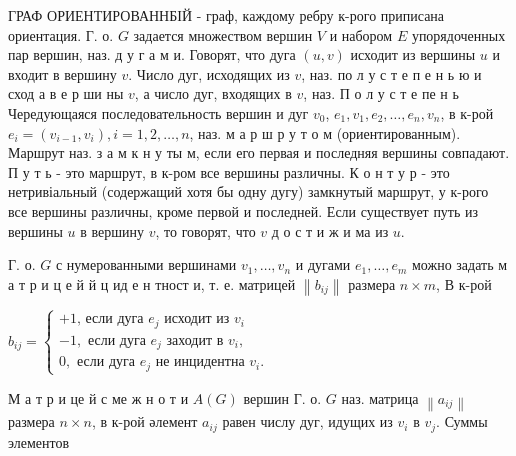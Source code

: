 \documentclass[10pt]{article}
\begin{document}
ГРАФ ОРИЕНТИРОВАННБІЙ - граф, каждому ребру к-рого приписана ориентация. Г. о. $G$ задается множеством вершин $V$ и набором $E$ упорядоченных пар вершин, наз. д у г а м и. Говорят, что дуга $(u, v)$ исходит из вершины $u$ и входит в вершину $v$. Число дуг, исходящих из $v$, наз. по л у с т е п е н ь ю и сход а в е р ши ны $v$, а число дуг, входящих в $v$, наз. П о л у с т е пе н ь Чередующаяся последовательность вершин и дуг $v_{0}$, $e_{1}, v_{1}, e_{2}, \ldots, e_{n}, v_{n}$, в к-рой $e_{i}=\left(v_{i-1}, v_{i}\right), i=1,2, \ldots, n$, наз. м а р ш р у т о м (ориентированным). Маршрут наз. з а м к н у ты м, если его первая и последняя вершины совпадают. П у т ь - это маршрут, в к-ром все вершины различны. К о н т у р - это нетривіальный (содержащий хотя бы одну дугу) замкнутый маршрут, у к-рого все вершины различны, кроме первой и последней. Если существует путь из вершины $u$ в вершину $v$, то говорят, что $v$ д о с т и ж и ма из $u$.



Г. о. $G$ с нумерованными вершинами $v_{1}, \ldots, v_{n}$ и дугами $e_{1}, \ldots, e_{m}$ можно задать м а т р и ц е й й ц ид е н тност и, т. е. матрицей $\left\|b_{i j}\right\|$ размера $n \times m$, В к-рой



$b_{i j}=\left\{\begin{array}{c}+1 \text {, если дуга } e_{j} \text { исходит из } v_{i} \\ -1, \text { если дуга } e_{j} \text { заходит в } v_{i}, \\ 0, \text { если дуга } e_{j} \text { не инцидентна } v_{i} .\end{array}\right.$



М а т р и це й с ме ж н о т и $A(G)$ вершин Г. о. $G$ наз. матрица $\left\|a_{i j}\right\|$ размера $n \times n$, в к-рой әлемент $a_{i j}$ равен числу дуг, идущих из $v_{i}$ в $v_{j}$. Суммы элементов
\end{document}
